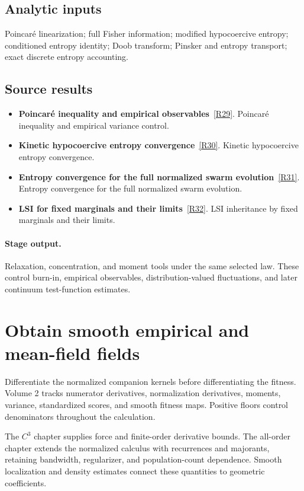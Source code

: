 \documentclass[11pt,a4paper]{article}
\begin{document}
\subsection*{Analytic inputs}
Poincar\'e linearization; full Fisher information; modified hypocoercive entropy; conditioned entropy identity; Doob transform; Pinsker and entropy transport; exact discrete entropy accounting.
\subsection*{Source results}
\begin{itemize}
\item \textbf{Poincaré inequality and empirical observables}~\hyperref[src:cor-quantitative-lsi-final]{[R29]}. Poincar\'e inequality and empirical variance control.
\item \textbf{Kinetic hypocoercive entropy convergence}~\hyperref[src:thm-villani-hypocoercivity]{[R30]}. Kinetic hypocoercive entropy convergence.
\item \textbf{Entropy convergence for the full normalized swarm evolution}~\hyperref[src:thm-kl-convergence-euclidean]{[R31]}. Entropy convergence for the full normalized swarm evolution.
\item \textbf{LSI for fixed marginals and their limits}~\hyperref[src:cor-kl-lsi-mean-field-limit]{[R32]}. LSI inheritance by fixed marginals and their limits.
\end{itemize}
\paragraph{Stage output.} Relaxation, concentration, and moment tools under the same selected law. These control burn-in, empirical observables, distribution-valued fluctuations, and later continuum test-function estimates.

\section{Obtain smooth empirical and mean-field fields}
\label{stage:9}
Differentiate the normalized companion kernels before differentiating the fitness. Volume 2 tracks numerator derivatives, normalization derivatives, moments, variance, standardized scores, and smooth fitness maps. Positive floors control denominators throughout the calculation.

The \(C^3\) chapter supplies force and finite-order derivative bounds. The all-order chapter extends the normalized calculus with recurrences and majorants, retaining bandwidth, regularizer, and population-count dependence. Smooth localization and density estimates connect these quantities to geometric coefficients.
\end{document}
